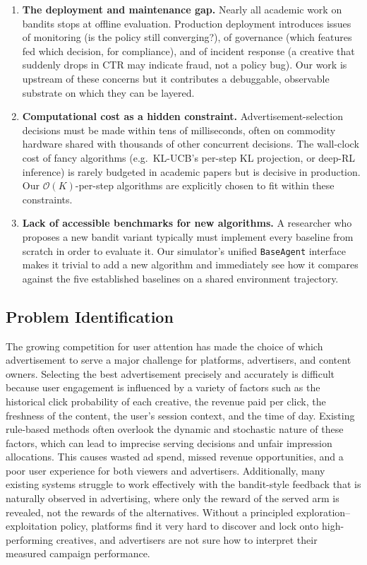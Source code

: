 \begin{enumerate}
\item \textbf{The deployment and maintenance gap.} Nearly all academic work on bandits stops at offline evaluation. Production deployment introduces issues of monitoring (is the policy still converging?), of governance (which features fed which decision, for compliance), and of incident response (a creative that suddenly drops in CTR may indicate fraud, not a policy bug). Our work is upstream of these concerns but it contributes a debuggable, observable substrate on which they can be layered.

\item \textbf{Computational cost as a hidden constraint.} Advertisement-selection decisions must be made within tens of milliseconds, often on commodity hardware shared with thousands of other concurrent decisions. The wall-clock cost of fancy algorithms (e.g.\ KL-UCB's per-step KL projection, or deep-RL inference) is rarely budgeted in academic papers but is decisive in production. Our $\mathcal{O}(K)$-per-step algorithms are explicitly chosen to fit within these constraints.

\item \textbf{Lack of accessible benchmarks for new algorithms.} A researcher who proposes a new bandit variant typically must implement every baseline from scratch in order to evaluate it. Our simulator's unified \texttt{BaseAgent} interface makes it trivial to add a new algorithm and immediately see how it compares against the five established baselines on a shared environment trajectory.
\end{enumerate}

\subsection{Problem Identification}
The growing competition for user attention has made the choice of which advertisement to serve a major challenge for platforms, advertisers, and content owners. Selecting the best advertisement precisely and accurately is difficult because user engagement is influenced by a variety of factors such as the historical click probability of each creative, the revenue paid per click, the freshness of the content, the user's session context, and the time of day. Existing rule-based methods often overlook the dynamic and stochastic nature of these factors, which can lead to imprecise serving decisions and unfair impression allocations. This causes wasted ad spend, missed revenue opportunities, and a poor user experience for both viewers and advertisers. Additionally, many existing systems struggle to work effectively with the bandit-style feedback that is naturally observed in advertising, where only the reward of the served arm is revealed, not the rewards of the alternatives. Without a principled exploration--exploitation policy, platforms find it very hard to discover and lock onto high-performing creatives, and advertisers are not sure how to interpret their measured campaign performance.

